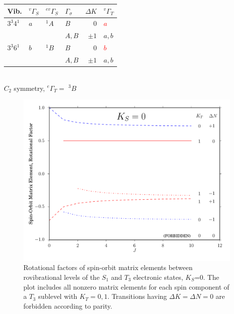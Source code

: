 \documentclass[12pt]{mitthesis}
\begin{document}

\begin{table}
  \centering

  \begin{tabular}{llllrl}
    Vib.
    & $^{v}\Gamma_S$ & $^{ev}\Gamma_S$ & $\Gamma_\sigma$ & $\Delta K$ & $^{v}\Gamma_T$ \\
    \toprule

    $3^3 4^1$ 
    & $a$ & $^{1}A$ & $B$ & $0$ & \textcolor{red}{$a$} \\
    & & & $A, B$ & $\pm1$ & $a, b$ \\[10pt]

    $3^3 6^1$ 
    & $b$ & $^{1}B$ & $B$ & $0$ & \textcolor{red}{$b$} \\
    & & & $A, B$ & $\pm1$ & $a, b$ \\

  \end{tabular}\\[5mm]

  $C_{2}$ symmetry, $^{e}\Gamma_T =$ $^{3}B$
\end{table}

\begin{figure}
  \caption{Rotational factors of spin-orbit matrix elements between
    rovibrational levels of the $S_1$ and $T_3$ electronic states,
    $K_S$=0.  The plot includes all nonzero matrix elements for each
    spin component of a $T_3$ sublevel with $K_T=0,1$.  Transitions
    having $\Delta K = \Delta N = 0$ are forbidden according to
    parity.}
  \centering
  \includegraphics[width=6in]{rotational-factors-k0.pdf}
\end{figure}
\end{document}
